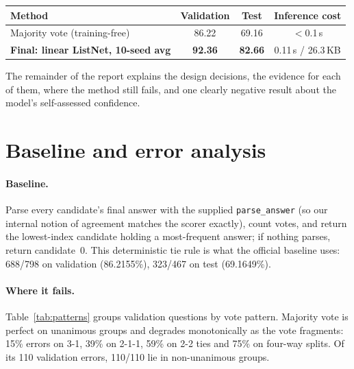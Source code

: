 \documentclass[10pt,a4paper]{article}
\begin{document}
\begin{center}
\small
\begin{tabular}{lccc}
\hline
Method & Validation & Test & Inference cost \\
\hline
Majority vote (training-free) & 86.22 & 69.16 & $<$0.1\,s \\
\textbf{Final: linear ListNet, 10-seed avg} & \textbf{92.36} & \textbf{82.66} & 0.11\,s / 26.3\,KB \\
\hline
\end{tabular}
\end{center}

The remainder of the report explains the design decisions, the evidence for
each of them, where the method still fails, and one clearly negative result
about the model's self-assessed confidence.

\section{Baseline and error analysis}
\label{sec:baseline}

\paragraph{Baseline.} Parse every candidate's final answer with the supplied
\texttt{parse\_answer} (so our internal notion of agreement matches the
scorer exactly), count votes, and return the lowest-index candidate holding a
most-frequent answer; if nothing parses, return candidate~0. This deterministic
tie rule is what the official baseline uses: 688/798 on validation
(86.2155\%), 323/467 on test (69.1649\%).

\paragraph{Where it fails.} Table~\ref{tab:patterns} groups validation
questions by vote pattern. Majority vote is perfect on unanimous groups and
degrades monotonically as the vote fragments: 15\% errors on 3-1, 39\% on
2-1-1, 59\% on 2-2 ties and 75\% on four-way splits. Of its 110 validation
errors, 110/110 lie in non-unanimous groups.
\end{document}
